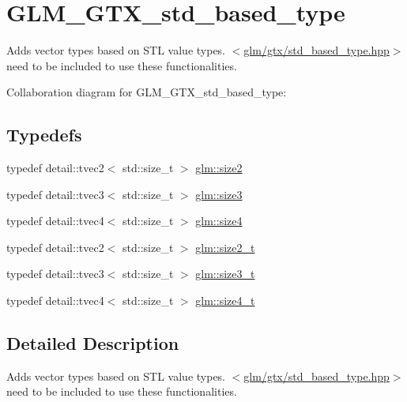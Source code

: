 \hypertarget{group__gtx__std__based__type}{}\section{G\+L\+M\+\_\+\+G\+T\+X\+\_\+std\+\_\+based\+\_\+type}
\label{group__gtx__std__based__type}


Adds vector types based on S\+T\+L value types. $<$\hyperlink{std__based__type_8hpp}{glm/gtx/std\+\_\+based\+\_\+type.\+hpp}$>$ need to be included to use these functionalities.  


Collaboration diagram for G\+L\+M\+\_\+\+G\+T\+X\+\_\+std\+\_\+based\+\_\+type\+:
\subsection*{Typedefs}
\begin{DoxyCompactItemize}
\item 
typedef detail\+::tvec2$<$ std\+::size\+\_\+t $>$ \hyperlink{group__gtx__std__based__type_ga0fa18ecab85aa909d4460e1a15e29b13}{glm\+::size2}
\item 
typedef detail\+::tvec3$<$ std\+::size\+\_\+t $>$ \hyperlink{group__gtx__std__based__type_gaecfda56edf7fb1a0b98401c8cca8ffd6}{glm\+::size3}
\item 
typedef detail\+::tvec4$<$ std\+::size\+\_\+t $>$ \hyperlink{group__gtx__std__based__type_ga40ecc163f6abc59bc17dbc3040999e64}{glm\+::size4}
\item 
typedef detail\+::tvec2$<$ std\+::size\+\_\+t $>$ \hyperlink{group__gtx__std__based__type_gafc6ee1f14c4940c0dd86226f9e8d51ae}{glm\+::size2\+\_\+t}
\item 
typedef detail\+::tvec3$<$ std\+::size\+\_\+t $>$ \hyperlink{group__gtx__std__based__type_ga72cefc5d9c0cc5efac63f1cc050b0c3b}{glm\+::size3\+\_\+t}
\item 
typedef detail\+::tvec4$<$ std\+::size\+\_\+t $>$ \hyperlink{group__gtx__std__based__type_ga008fbe5ecf66e1fc6626ab9b5a38e27e}{glm\+::size4\+\_\+t}
\end{DoxyCompactItemize}


\subsection{Detailed Description}
Adds vector types based on S\+T\+L value types. $<$\hyperlink{std__based__type_8hpp}{glm/gtx/std\+\_\+based\+\_\+type.\+hpp}$>$ need to be included to use these functionalities. 



